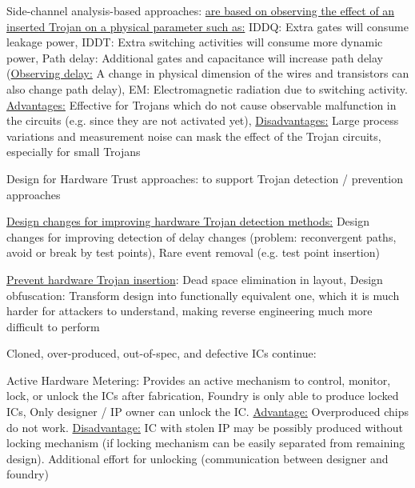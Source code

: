 \documentclass[landscape, a4paper]{article}
\begin{document}
\begin{minipage}[t]{0.2\linewidth}
	\begin{betterlist}
		\item \alert{Side-channel analysis-based approaches:} \uline{are based on observing the effect of an inserted Trojan on a physical parameter such as:} \alert{IDDQ:} Extra gates will consume leakage power, \alert{IDDT:} Extra switching activities will consume more dynamic power, \alert{Path delay:} Additional gates and capacitance will increase path delay (\underline{Observing delay:} A change in physical dimension of the wires and transistors can also change path delay), \alert{EM:} Electromagnetic radiation due to switching activity. \underline{Advantages:} Effective for Trojans which do not cause observable malfunction in the circuits (e.g. since they are not activated yet), \underline{Disadvantages:} Large process variations and measurement noise can mask the effect of the Trojan circuits, especially for small Trojans
		\item \alert{Design for Hardware Trust approaches:} to support Trojan detection / prevention approaches
		\begin{betterlist}
			\item \underline{Design changes for improving hardware Trojan detection methods:} \alert{Design changes for improving detection of delay changes} (problem: reconvergent paths, avoid or break by test points), \alert{Rare event removal} (e.g. test point insertion)
			\item \underline{Prevent hardware Trojan insertion}: \alert{Dead space elimination in layout}, \alert{Design obfuscation:} Transform design into functionally equivalent one, which it is much harder for attackers to understand, making reverse engineering much more difficult to perform
		\end{betterlist}
		\item \alert{Cloned, over-produced, out-of-spec, and defective ICs continue:}
		\begin{betterlist}
			\item \alert{Active Hardware Metering:} Provides an active mechanism to control, monitor, lock, or unlock the ICs after fabrication, Foundry is only able to produce locked ICs, Only designer / IP owner can unlock the IC. \underline{Advantage:} Overproduced chips do not work. \underline{Disadvantage:} IC with stolen IP may be possibly produced without locking mechanism (if locking mechanism can be easily separated from remaining design). Additional effort for unlocking (communication between designer and foundry)

\end{betterlist}
\end{betterlist}
\end{minipage}
\end{document}
